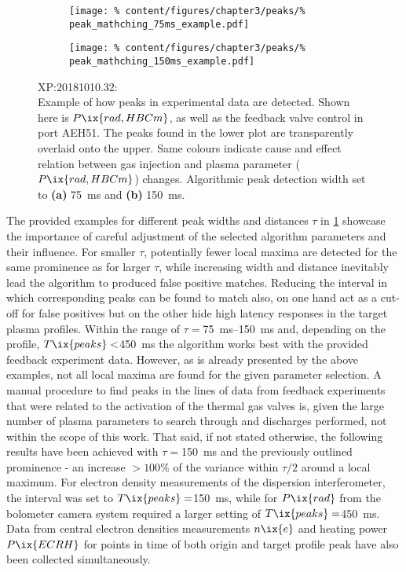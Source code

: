 %
    \begin{figure}[t]%
        \centering%
        \begin{subfigure}{0.49\textwidth}%
            \texttt{[image: \%
                content/figures/chapter3/peaks/\%
                peak\_mathching\_75ms\_example.pdf]}%
            \caption{}%
        \end{subfigure}%
        \begin{subfigure}{0.49\textwidth}%
            \texttt{[image: \%
                content/figures/chapter3/peaks/\%
                peak\_mathching\_150ms\_example.pdf]}%
            \caption{}%
        \end{subfigure}%
        \caption{%
            XP:20181010.32:\\%
            Example of how peaks in experimental data are detected. Shown here is $P\ix{rad,HBCm}$, as well as the feedback valve control in port AEH51. The peaks found in the lower plot are transparently overlaid onto the upper. Same colours indicate cause and effect relation between gas injection and plasma parameter ($P\ix{rad,HBCm}$) changes.  Algorithmic peak detection width set to \textbf{(a)} \SI{75}{\milli\second} and \textbf{(b)} \SI{150}{\milli\second}.}\label{fig:peak_finding_examples}%
    \end{figure}%
%
    The provided examples for different peak widths and distances $\tau$ in \cref{fig:peak_finding_examples} showcase the importance of careful adjustment of the selected algorithm parameters and their influence. For smaller $\tau$, potentially fewer local maxima are detected for the same prominence as for larger $\tau$, while increasing width and distance inevitably lead the algorithm to produced false positive matches. Reducing the interval in which corresponding peaks can be found to match also, on one hand act as a cut-off for false positives but on the other hide high latency responses in the target plasma profiles. Within the range of $\tau=$\SIrange{75}{150}{\milli\second} and, depending on the profile, $T\ix{peaks}<$\SI{450}{\milli\second} the algorithm works best with the provided feedback experiment data. However, as is already presented by the above examples, not all local maxima are found for the given parameter selection. A manual procedure to find peaks in the lines of data from feedback experiments that were related to the activation of the thermal gas valves is, given the large number of plasma parameters to search through and discharges performed, not within the scope of this work. That said, if not stated otherwise, the following results have been achieved with $\tau=$\SI{150}{\milli\second} and the previously outlined prominence - an increase $>100\%$ of the variance within $\tau/2$ around a local maximum. For electron density measurements of the dispersion interferometer, the interval was set to $T\ix{peaks}=$\SI{150}{\milli\second}, while for $P\ix{rad}$ from the bolometer camera system required a larger setting of $T\ix{peaks}=$\SI{450}{\milli\second}. Data from central electron densities measurements $n\ix{e}$ and heating power $P\ix{ECRH}$ for points in time of both origin and target profile peak have also been collected simultaneously.\\%
